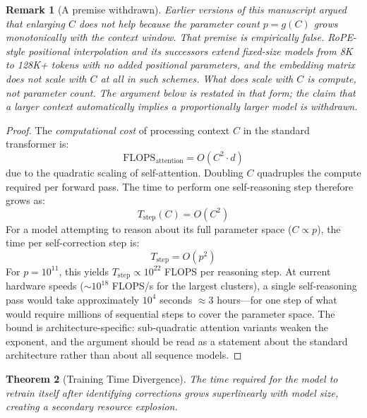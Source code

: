 \documentclass[11pt,a4paper]{article}
\newtheorem{theorem}{Theorem}[section]
\newtheorem{remark}[theorem]{Remark}
\begin{document}
\begin{remark}[A premise withdrawn]
\label{rem:rope}
Earlier versions of this manuscript argued that enlarging $C$ does not help because the parameter count $p = g(C)$ grows monotonically with the context window. That premise is empirically false. RoPE-style positional interpolation and its successors extend fixed-size models from 8K to 128K+ tokens with \emph{no} added positional parameters, and the embedding matrix does not scale with $C$ at all in such schemes. What does scale with $C$ is \emph{compute}, not parameter count. The argument below is restated in that form; the claim that a larger context automatically implies a proportionally larger model is withdrawn.
\end{remark}

\begin{proof}
The \emph{computational cost} of processing context $C$ in the standard transformer is:
\begin{equation}
\mathrm{FLOPS}_{\mathrm{attention}} = O(C^2 \cdot d)
\end{equation}
due to the quadratic scaling of self-attention. Doubling $C$ quadruples the compute required per forward pass. The time to perform one self-reasoning step therefore grows as:
\begin{equation}
T_{\mathrm{step}}(C) = O(C^2)
\end{equation}
For a model attempting to reason about its full parameter space ($C \propto p$), the time per self-correction step is:
\begin{equation}
T_{\mathrm{step}} = O(p^2)
\end{equation}
For $p = 10^{11}$, this yields $T_{\mathrm{step}} \propto 10^{22}$ FLOPS per reasoning step. At current hardware speeds ($\sim10^{18}$ FLOPS/s for the largest clusters), a single self-reasoning pass would take approximately $10^4$ seconds $\approx 3$ hours---for one step of what would require millions of sequential steps to cover the parameter space. The bound is architecture-specific: sub-quadratic attention variants weaken the exponent, and the argument should be read as a statement about the standard architecture rather than about all sequence models.
\end{proof}

\begin{theorem}[Training Time Divergence]
\label{thm:training_time}
The time required for the model to retrain itself after identifying corrections grows superlinearly with model size, creating a secondary resource explosion.
\end{theorem}
\end{document}
